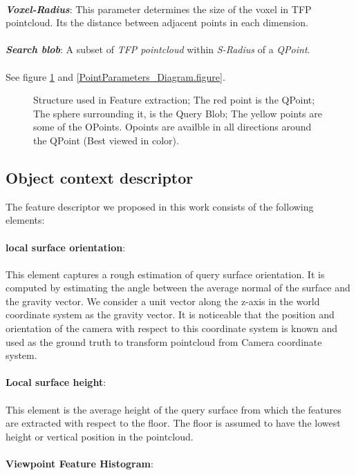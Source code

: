 \\
\textbf{\textit{Voxel-Radius}}: This parameter determines the size of the voxel in TFP pointcloud. Its the distance between adjacent points in each dimension.\\
\\
\textbf{\textit{Search blob}}: A subset of {\it TFP pointcloud} within {\it S-Radius} of a {\it QPoint}. 
\\
\\
See figure \ref{FEStructure.figure} and \ref{PointParameters_Diagram.figure}.

\begin{figure}[t]
  \caption[Illustration of the items used in Feature Extract.]
  {Structure used in Feature extraction; The red point is the QPoint; The sphere surrounding it, is the Query Blob; The yellow
  points are some of the OPoints. Opoints are availble in all directions around the QPoint (Best viewed in color).}
  \label{FEStructure.figure}
\end{figure}



\subsection{Object context descriptor}
\label{OCD.ssec}
 
The feature descriptor we proposed in this work consists of the following elements:\\
\\
{\bf local surface orientation}:\\
\\

This element captures a rough estimation of query surface orientation. It is computed by estimating the angle between the average normal of the surface and the gravity vector. We consider a unit vector along the z-axis in the world coordinate system as the gravity vector. It is noticeable that the position and orientation of the camera with respect to this coordinate system is known and used as the ground truth to transform pointcloud from Camera coordinate system.\\
\\
{\bf Local surface height}:\\
\\

This element is the average height of the query surface from which the features are extracted with respect to the floor. The floor is assumed to have the lowest height or vertical position in the pointcloud.\\
\\
{\bf Viewpoint Feature Histogram}:\\
\\

